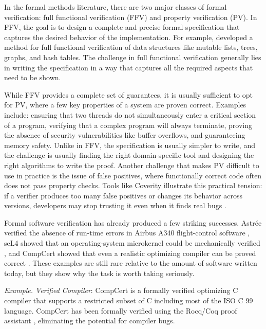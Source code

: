 In the formal methods literature, there are two major classes of formal verification: full functional verification (FFV) and property verification (PV). In FFV, the goal is to design a complete and precise formal specification that captures the desired behavior of the implementation. For example, \citet{zee2008full} developed a method for full functional verification of data structures like mutable lists, trees, graphs, and hash tables. The challenge in full functional verification generally lies in writing the specification in a way that captures all the required aspects that need to be shown.

While FFV provides a complete set of guarantees, it is usually sufficient to opt for PV, where a few key properties of a system are proven correct. Examples include: ensuring that two threads do not simultaneously enter a critical section of a program, verifying that a complex program will always terminate, proving the absence of security vulnerabilities like buffer overflows, and guaranteeing memory safety. Unlike in FFV, the specification is usually simpler to write, and the challenge is usually finding the right domain-specific tool and designing the right algorithms to write the proof. Another challenge that makes PV difficult to use in practice is the issue of false positives, where functionally correct code often does not pass property checks. Tools like Coverity illustrate this practical tension: if a verifier produces too many false positives or changes its behavior across versions, developers may stop trusting it even when it finds real bugs \citep{bessey2010few}.

Formal software verification has already produced a few striking successes. Astrée verified the absence of run-time errors in Airbus A340 flight-control software \citep{cousot2005astree}, seL4 showed that an operating-system microkernel could be mechanically verified \citep{klein2009sel4}, and CompCert showed that even a realistic optimizing compiler can be proved correct \citep{leroy2016compcert}. These examples are still rare relative to the amount of software written today, but they show why the task is worth taking seriously.

\begin{tcolorbox}[colback=lightblue, boxrule=0pt, arc=5pt, outer arc=5pt]
\textit{Example. Verified Compiler}:
CompCert \citep{leroy2016compcert} is a formally verified optimizing C compiler that supports a restricted subset of C including most of the ISO C 99 language. CompCert has been formally verified using the Rocq/Coq proof assistant \citep{Coq-refman}, eliminating the potential for compiler bugs.
\end{tcolorbox}

